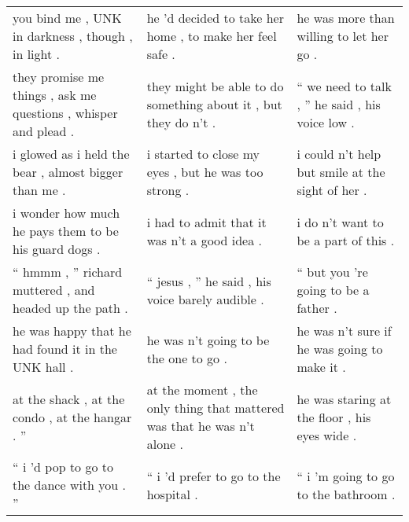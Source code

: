 \documentclass{article}
\begin{document}
\begin{landscape}
\begin{table}[!h]
\begin{center}
{\begin{small}
\begin{tabular}{lll}
                      you bind me , UNK in darkness , though , in light .                            &                 he 'd decided to take her home , to make her feel safe .                           &                         he was more than willing to let her go .                               \\
          they promise me things , ask me questions , whisper and plead .                            &           they might be able to do something about it , but they do n't .                          &                    `` we need to talk , '' he said , his voice low .                           \\
                    i glowed as i held the bear , almost bigger than me .                            &                    i started to close my eyes , but he was too strong .                            &                   i could n't help but smile at the sight of her .                             \\
                    i wonder how much he pays them to be his guard dogs .                            &                           i had to admit that it was n't a good idea .                             &                              i do n't want to be a part of this .                              \\
                 `` hmmm , '' richard muttered , and headed up the path .                            &                     `` jesus , '' he said , his voice barely audible .                             &                            `` but you 're going to be a father .                               \\
                      he was happy that he had found it in the UNK hall .                            &                                he was n't going to be the one to go .                              &                       he was n't sure if he was going to make it .                             \\
                         at the shack , at the condo , at the hangar . ''                            &   at the moment , the only thing that mattered was that he was n't alone .                         &                     he was staring at the floor , his eyes wide .                              \\
                             `` i 'd pop to go to the dance with you . ''                            &                               `` i 'd prefer to go to the hospital .                               &                            `` i 'm going to go to the bathroom .                               \\

\end{tabular}
\end{small}}
\end{center}
\end{table}
\end{landscape}
\end{document}
